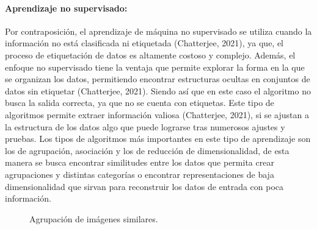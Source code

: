 \documentclass[12pt,letterpaper,final, openany]{scrbook}
\begin{document}
\paragraph{Aprendizaje no supervisado:}

Por contraposición, el aprendizaje de máquina no supervisado se utiliza cuando la información no está clasificada ni etiquetada (Chatterjee, 2021), ya que, el proceso de etiquetación de datos es altamente costoso y complejo. Además, el enfoque no supervisado tiene la ventaja que permite explorar la forma en la que se organizan los datos, permitiendo encontrar estructuras ocultas en conjuntos de datos sin etiquetar (Chatterjee, 2021). Siendo así que en este caso el algoritmo no busca la salida correcta, ya que no se cuenta con etiquetas. Este tipo de algoritmos permite extraer información valiosa (Chatterjee, 2021), si se ajustan a la estructura de los datos algo que puede lograrse tras numerosos ajustes y pruebas. Los tipos de algoritmos más importantes en este tipo de aprendizaje son los de agrupación, asociación y los de reducción de dimensionalidad, de esta manera se busca encontrar similitudes entre los datos que permita crear agrupaciones y distintas categorías o encontrar representaciones de baja dimensionalidad que sirvan para reconstruir los datos de entrada con poca información.

\begin{figure}
\centering
{}%
\hfill
{}%
\hfill
\caption{Agrupación de imágenes similares.}
\end{figure}
\end{document}
